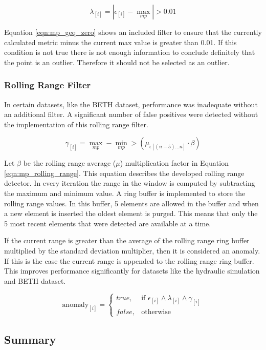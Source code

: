 \begin{equation}
    \label{eqn:mp_geq_zero}
    \lambda_{[i]} = \left| \epsilon_{[i]} - \max_{mp} \right| > 0.01
\end{equation}

Equation \eqref{eqn:mp_geq_zero} shows an included filter to ensure that the currently calculated metric minus the current max value is greater than 0.01. If this condition is not true there is not enough information to conclude definitely that the point is an outlier. Therefore it should not be selected as an outlier.

\subsubsection{Rolling Range Filter}

In certain datasets, like the BETH dataset, performance was inadequate without an additional filter. A significant number of false positives were detected without the implementation of this rolling range filter.

\begin{equation}
    \label{eqn:mp_rolling_range}
    \gamma_{[i]} = \max_{mp} - \min_{mp} > \left(\mu_{\epsilon[(n-5)...n]} \cdot \beta \right)
\end{equation}

Let $ \beta$ be the rolling range average ($\mu$) multiplication factor in Equation \eqref{eqn:mp_rolling_range}. This equation describes the developed rolling range detector. In every iteration the range in the window is computed by subtracting the maximum and minimum value. A ring buffer is implemented to store the rolling range values. In this buffer, 5 elements are allowed in the buffer and when a new element is inserted the oldest element is purged. This means that only the 5 most recent elements that were detected are available at a time.

If the current range is greater than the average of the rolling range ring buffer multiplied by the standard deviation multiplier, then it is considered an anomaly. If this is the case the current range is appended to the rolling range ring buffer. This improves performance significantly for datasets like the hydraulic simulation and BETH dataset.

\begin{equation}
    \label{eqn:mp_cumulative}
    \text{anomaly}_{[i]}=
    \begin{cases}
        true,& \text{if } \epsilon_{[i]} \land \lambda_{[i]} \land \gamma_{[i]}\\
        false,              & \text{otherwise}
    \end{cases}
\end{equation}

\subsection{Summary}